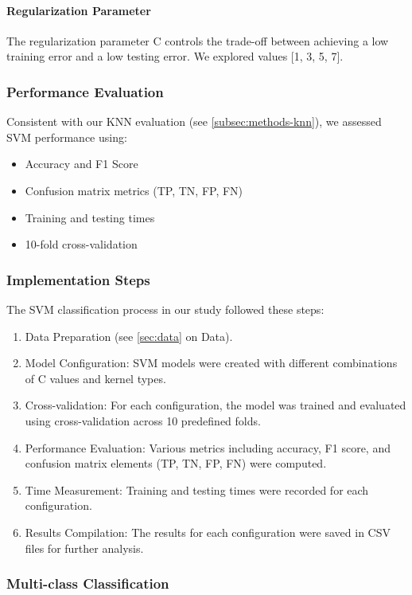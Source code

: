 \paragraph{Regularization Parameter}
The regularization parameter C controls the trade-off between achieving a low training error and a low testing error. We explored values [1, 3, 5, 7].

\subsubsection{Performance Evaluation}
Consistent with our KNN evaluation (see \autoref{subsec:methods-knn}), we assessed SVM performance using:
\begin{itemize}
    \item Accuracy and F1 Score
    \item Confusion matrix metrics (TP, TN, FP, FN)
    \item Training and testing times
    \item 10-fold cross-validation
\end{itemize}

\subsubsection{Implementation Steps}

The SVM classification process in our study followed these steps:

\begin{enumerate}
    \item Data Preparation (see \autoref{sec:data} on Data).
    \item Model Configuration: SVM models were created with different combinations of C values and kernel types.
    \item Cross-validation: For each configuration, the model was trained and evaluated using cross-validation across 10 predefined folds.
    \item Performance Evaluation: Various metrics including accuracy, F1 score, and confusion matrix elements (TP, TN, FP, FN) were computed.
    \item Time Measurement: Training and testing times were recorded for each configuration.
    \item Results Compilation: The results for each configuration were saved in CSV files for further analysis.
\end{enumerate}

\subsubsection{Multi-class Classification}

